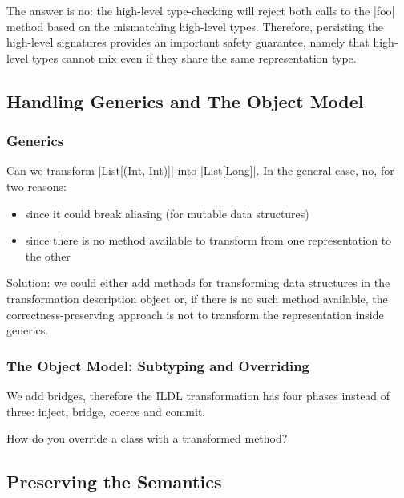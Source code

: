 The answer is no: the high-level type-checking will reject both calls to the |foo| method based on the mismatching high-level types. Therefore, persisting the high-level signatures provides an important safety guarantee, namely that high-level types cannot mix even if they share the same representation type.

\subsection{Handling Generics and The Object Model}
\label{sec:ildl:generics}


\subsubsection{Generics}

Can we transform |List[(Int, Int)]| into |List[Long]|. In the general case, no, for two reasons:
\begin{itemize}
  \item since it could break aliasing (for mutable data structures)
  \item since there is no method available to transform from one representation to the other
\end{itemize}

Solution: we could either add methods for transforming data structures in the transformation description object or, if there is no such method available, the correctness-preserving approach is not to transform the representation inside generics.


\subsubsection{The Object Model: Subtyping and Overriding}
We add bridges, therefore the ILDL transformation has four phases instead of three: inject, bridge, coerce and commit.

How do you override a class with a transformed method?

\subsection{Preserving the Semantics}
\label{sec:ildl:semantics}

